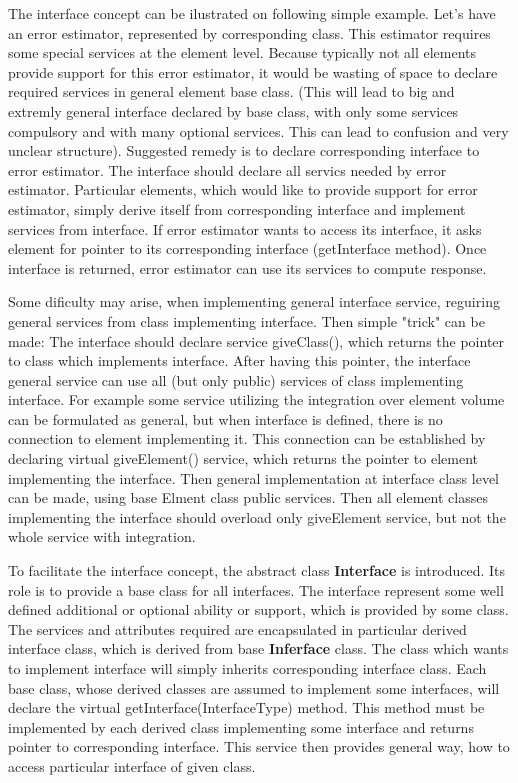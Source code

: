 \documentclass[a4paper]{article}
\newcommand{\class}[1]{{\bf #1}}
\begin{document}
The interface concept can be ilustrated on following simple example. 
Let's have an error estimator, represented by corresponding class. This estimator requires some special 
services at the element level. Because typically not all elements provide support for this error estimator,
it would be wasting of space to declare required services in general element base class.
(This will lead to big and extremly general interface declared by base class, 
with only some services compulsory and with many optional services. This can lead to confusion and very unclear structure).
Suggested remedy is to declare corresponding interface to error estimator. The interface 
should declare all servics needed by error estimator. Particular elements, which would like to provide support for
error estimator, simply derive itself from corresponding interface and implement services from interface.
If error estimator wants to access its interface, it asks element for pointer to its corresponding interface
(getInterface method). Once interface is returned, error estimator can use its services to compute response.

Some dificulty may arise, when implementing general interface service, reguiring general services
from class implementing interface. Then simple "trick" can be made:
The interface should declare service giveClass(), which returns the pointer to class which implements interface.
After having this pointer, the interface general service can use all (but only public) services of class implementing
interface. For example some service utilizing the integration over element volume can be formulated as general,
but when interface is defined, there is no connection to element implementing it. This connection can be established
by declaring virtual giveElement() service, which returns the pointer to element implementing the interface. 
Then general implementation at interface class level can be made, using base Elment class public services. 
Then all element classes implementing the interface should overload only giveElement service, but not the whole 
service with integration.

To facilitate the interface concept, the abstract class
\class{Interface} is introduced. Its role is to provide a base class for all interfaces. 
The interface represent some well defined additional or optional ability or support, which is provided by some class.
The services and attributes required are encapsulated in particular
derived interface class, which is derived from base \class{Inferface} class.
The class which wants to implement interface will simply inherits corresponding interface class.
Each base class, whose derived classes are assumed to implement some interfaces, will declare
the virtual getInterface(InterfaceType) method. This method must be implemented by each derived class implementing
some interface and returns pointer to corresponding interface. This
service then provides general way, how to
access particular interface of given class. 
	
\end{document}
